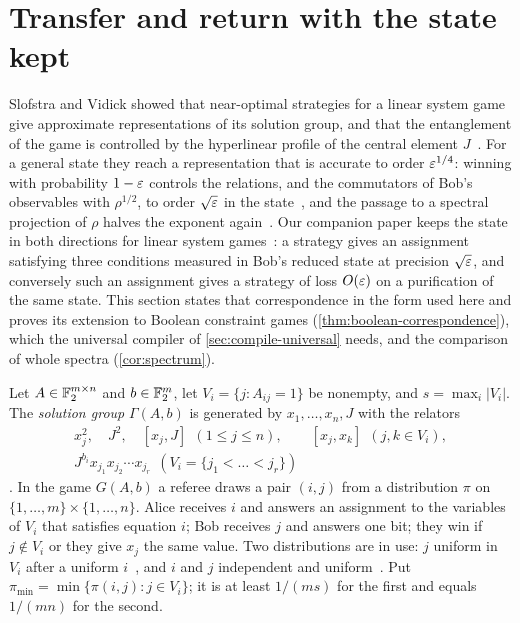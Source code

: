 \section{Transfer and return with the state kept}\label{sec:transfer}

Slofstra and Vidick showed that near-optimal strategies for a linear system game give approximate representations of
its solution group, and that the entanglement of the game is controlled by the hyperlinear profile of the central
element $J$~\cite{SV18}. For a general state they reach a representation that is accurate to order $\varepsilon^{1/4}$: winning
with probability $1-\varepsilon$ controls the relations, and the commutators of Bob's observables with $\rho^{1/2}$, to order
$\sqrt{\varepsilon}$ in the state~\cite[Proposition~5.4]{SV18}, and the passage to a spectral projection of $\rho$ halves the
exponent again~\cite[Theorem~5.1 and Lemmas~5.5, 5.6]{SV18}. Our companion paper keeps the state in both directions for
linear system games~\cite[Theorem~D]{DM-game}: a strategy gives an assignment satisfying three conditions measured in Bob's
reduced state at precision $\sqrt{\varepsilon}$, and conversely such an assignment gives a strategy of loss $O(\varepsilon)$ on a purification
of the same state. This section states that correspondence in the form used here and proves its extension to Boolean
constraint games (\cref{thm:boolean-correspondence}), which the universal compiler of \cref{sec:compile-universal} needs, and
the comparison of whole spectra (\cref{cor:spectrum}).

\begin{definition}\label{def:lsg}
Let $A\in\mathbb F_2^{m\times n}$ and $b\in\mathbb F_2^m$, let $V_i=\{j:A_{ij}=1\}$ be nonempty, and $s=\max_i|V_i|$. The \emph{solution
group} $\Gamma(A,b)$ is generated by $x_1,\dots,x_n,J$ with the relators
\begin{gather*}
x_j^2,\quad J^2,\quad[x_j,J]\ \ (1\le j\le n),\qquad[x_j,x_k]\ \ (j,k\in V_i),\\
J^{b_i}x_{j_1}x_{j_2}\cdots x_{j_r}\ \ (V_i=\{j_1<\dots<j_r\})
\end{gather*}
\cite{CM14,CLS17}. In the game $G(A,b)$ a referee draws a pair $(i,j)$ from a distribution $\pi$ on
$\{1,\dots,m\}\times\{1,\dots,n\}$. Alice receives $i$ and answers an assignment to the variables of $V_i$ that satisfies
equation $i$; Bob receives $j$ and answers one bit; they win if $j\notin V_i$ or they give $x_j$ the same value. Two
distributions are in use: $j$ uniform in $V_i$ after a uniform $i$~\cite{DM-game}, and $i$ and $j$ independent and
uniform~\cite{SV18}. Put $\pi_{\min}=\min\{\pi(i,j):j\in V_i\}$; it is at least $1/(ms)$ for the first and equals
$1/(mn)$ for the second.
\end{definition}

